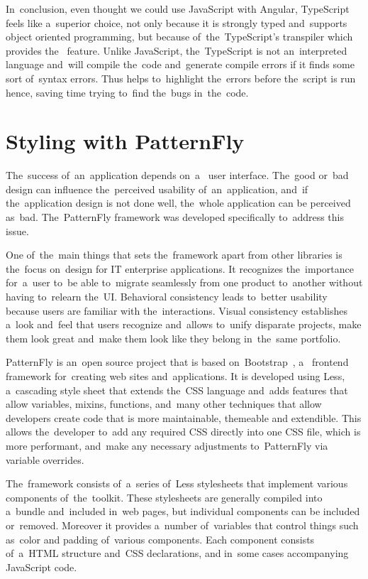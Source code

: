 In~conclusion, even thought we could use JavaScript with Angular, TypeScript
feels like a~superior choice, not only because it is strongly typed and~supports
object oriented programming, but because of~the~TypeScript's transpiler which
provides the~ feature. Unlike JavaScript,
the~TypeScript is not an~interpreted language and~will compile the~code
and~generate compile errors if it finds some sort of~syntax errors. Thus
helps to~highlight the~errors before the~script is run hence, saving time trying
to~find the~bugs in~the~code.

\section{Styling with PatternFly}
The~success of~an~application depends on~a~ user interface.
The~good or~bad design can influence the~perceived usability of~an~application,
and~if the~application design is not done well, the~whole application can be
perceived as~bad. The~PatternFly framework was developed specifically to~address
this issue.

One of~the~main things that sets the~framework apart from other libraries is
the~focus on~design for IT enterprise applications. It recognizes the~importance
for~a~user to~be able to~migrate seamlessly from one product to~another without
having to~relearn the~UI. Behavioral consistency leads to~better usability
because users are familiar with the~interactions. Visual consistency establishes
a~look and~feel that users recognize and~allows to~unify disparate projects,
make them look great and~make them look like they belong in~the~same portfolio.

PatternFly is an~open source project that is based
on~Bootstrap~\cite{Bootstrap}, a~ frontend framework
for~creating web sites and~applications. It is developed using
Less, a~cascading style sheet
 that extends the~CSS language and~adds features that allow
variables, mixins, functions, and~many other techniques that allow developers
create code that is more maintainable, themeable and extendible. This allows
the~developer to~add any required  CSS directly into one CSS
file, which is more performant, and~make any necessary adjustments to~PatternFly
via variable overrides.

The~framework consists of~a~series of~Less stylesheets that implement
various components of~the~toolkit. These stylesheets are generally compiled into
a~bundle and~included in~web pages, but individual components can be included
or~removed. Moreover it provides a~number of~variables that control things such
as~color and padding of~various components. Each component consists
of~a~HTML structure and~CSS declarations, and in~some cases
accompanying JavaScript code.

